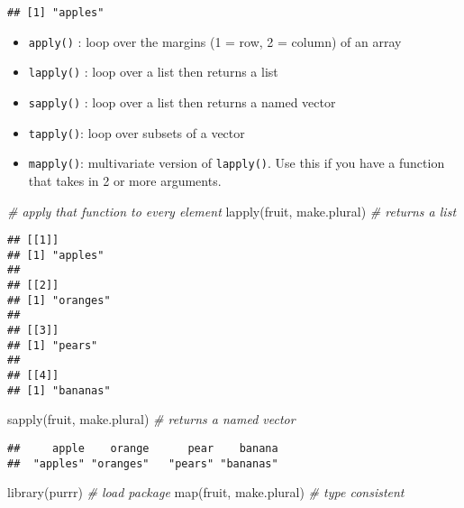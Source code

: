 \documentclass[
]{book}
\newenvironment{Shaded}{\begin{snugshade}}{\end{snugshade}}
\newcommand{\CommentTok}[1]{\textcolor[rgb]{0.56,0.35,0.01}{\textit{#1}}}
\newcommand{\FunctionTok}[1]{\textcolor[rgb]{0.00,0.00,0.00}{#1}}
\newcommand{\NormalTok}[1]{#1}
\providecommand{\tightlist}{%
  \setlength{\itemsep}{0pt}\setlength{\parskip}{0pt}}
\begin{document}
\begin{verbatim}
## [1] "apples"
\end{verbatim}

\begin{itemize}
\tightlist
\item
  \texttt{apply()} : loop over the margins (1 = row, 2 = column) of an array
\item
  \texttt{lapply()} : loop over a list then returns a list
\item
  \texttt{sapply()} : loop over a list then returns a named vector
\item
  \texttt{tapply()}: loop over subsets of a vector
\item
  \texttt{mapply()}: multivariate version of \texttt{lapply()}. Use this if you have a function that takes in 2 or more arguments.
\end{itemize}

\begin{Shaded}
\begin{Highlighting}[]
\CommentTok{\# apply that function to every element}
\FunctionTok{lapply}\NormalTok{(fruit, make.plural) }\CommentTok{\# returns a list}
\end{Highlighting}
\end{Shaded}

\begin{verbatim}
## [[1]]
## [1] "apples"
## 
## [[2]]
## [1] "oranges"
## 
## [[3]]
## [1] "pears"
## 
## [[4]]
## [1] "bananas"
\end{verbatim}

\begin{Shaded}
\begin{Highlighting}[]
\FunctionTok{sapply}\NormalTok{(fruit, make.plural) }\CommentTok{\# returns a named vector}
\end{Highlighting}
\end{Shaded}

\begin{verbatim}
##     apple    orange      pear    banana 
##  "apples" "oranges"   "pears" "bananas"
\end{verbatim}

\begin{Shaded}
\begin{Highlighting}[]
\FunctionTok{library}\NormalTok{(purrr) }\CommentTok{\# load package}
\FunctionTok{map}\NormalTok{(fruit, make.plural) }\CommentTok{\# type consistent}
\end{Highlighting}
\end{Shaded}
\end{document}
